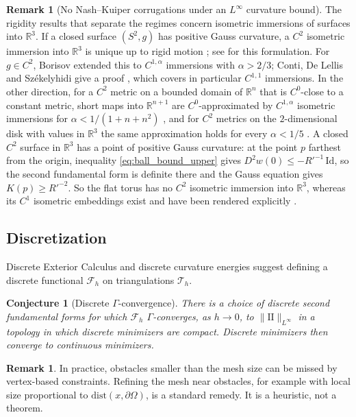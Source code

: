 \documentclass[11pt,reqno]{amsart}
\newtheorem{conjecture}[theorem]{Conjecture}
\theoremstyle{definition}
\newtheorem{remark}[theorem]{Remark}
\providecommand{\R}{\mathbb{R}}
\providecommand{\II}{\mathrm{I\!I}}
\newcommand{\dist}{\mathrm{dist}}
\numberwithin{equation}{section}
\providecommand{\II}{\mathrm{II}}
\providecommand{\R}{\mathbb{R}}
\begin{document}
\begin{remark}[No Nash--Kuiper corrugations under an $L^\infty$ curvature bound]
The rigidity results that separate the regimes concern isometric immersions of surfaces into $\R^3$. If a closed surface $(S^2, g)$ has positive Gauss curvature, a $C^2$ isometric immersion into $\R^3$ is unique up to rigid motion \cite{cohnvossen1927, herglotz1943}; see \cite[Section~1]{conti2012} for this formulation. For $g \in C^2$, Borisov extended this to $C^{1,\alpha}$ immersions with $\alpha > 2/3$; Conti, De Lellis and Sz\'ekelyhidi give a proof \cite[Theorem~1.7, Corollary~1.8]{conti2012}, which covers in particular $C^{1,1}$ immersions. In the other direction, for a $C^2$ metric on a bounded domain of $\R^n$ that is $C^0$-close to a constant metric, short maps into $\R^{n+1}$ are $C^0$-approximated by $C^{1,\alpha}$ isometric immersions for $\alpha < 1/(1+n+n^2)$ \cite[Theorem~1.1, Corollary~1.2]{conti2012}, and for $C^2$ metrics on the $2$-dimensional disk with values in $\R^3$ the same approximation holds for every $\alpha < 1/5$ \cite{delellis2018}. A closed $C^2$ surface in $\R^3$ has a point of positive Gauss curvature: at the point $p$ farthest from the origin, inequality \eqref{eq:ball_bound_upper} gives $D^2 w(0) \le -R'^{-1}\,\mathrm{Id}$, so the second fundamental form is definite there and the Gauss equation gives $K(p) \ge R'^{-2}$. So the flat torus has no $C^2$ isometric immersion into $\R^3$, whereas its $C^1$ isometric embeddings exist and have been rendered explicitly \cite{borrelli2012}.
\end{remark}

\subsection{Discretization}
Discrete Exterior Calculus \cite{hirani2003, crane2013} and discrete curvature energies \cite{wardetzky2007} suggest defining a discrete functional $\mathcal{F}_h$ on triangulations $\mathcal{T}_h$.

\begin{conjecture}[Discrete $\Gamma$-convergence]
\label{thm:dec_gamma_convergence}
There is a choice of discrete second fundamental forms for which $\mathcal{F}_h$ $\Gamma$-converges, as $h \to 0$, to $\|\II\|_{L^\infty}$ in a topology in which discrete minimizers are compact. Discrete minimizers then converge to continuous minimizers.
\end{conjecture}

\begin{remark}
In practice, obstacles smaller than the mesh size can be missed by vertex-based constraints. Refining the mesh near obstacles, for example with local size proportional to $\dist(x, \partial\Omega)$, is a standard remedy. It is a heuristic, not a theorem.
\end{remark}
\end{document}
